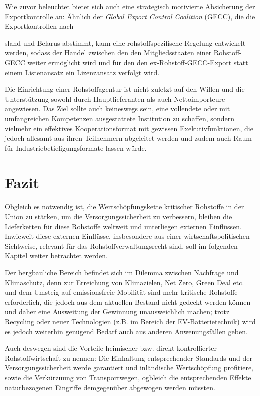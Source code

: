 \documentclass[12pt,a4paper,oneside]{book} %
\begin{document}
{Wie zuvor beleuchtet bietet sich auch eine strategisch motivierte Absicherung der Exportkontrolle an: Ähnlich der \textit{Global Export Control Coalition} (GECC), die die Exportkontrollen nach 

sland und Belarus abstimmt, kann eine rohstoffspezifische Regelung entwickelt werden, sodass der Handel zwischen den den Mitgliedsstaaten einer Rohstoff-GECC weiter ermöglicht wird und für den den ex-Rohstoff-GECC-Export statt einem Listenansatz ein Lizenzansatz verfolgt wird.\autocite[in Anlehnung an den Vorschlag von]{Medunic, Nr. 15, Juli 2024, S. 4}



Die Einrichtung einer Rohstoffagentur ist nicht zuletzt auf den Willen und die Unterstützung sowohl durch Hauptlieferanten als auch Nettoimporteure angewiesen. Das Ziel sollte auch keineswegs sein, eine vollendete oder mit umfangreichen Kompetenzen ausgestattete Institution zu schaffen, sondern vielmehr ein effektives Kooperationsformat mit gewissen Exekutivfunktionen, die jedoch allesamt aus ihren Teilnehmern abgeleitet werden und zudem auch Raum für Industriebetieligungsformate lassen würde.







\section{Fazit}
Obgleich es notwendig ist, die Wertschöpfungskette kritischer Rohstoffe in der Union zu stärken, um die Versorgungssicherheit zu verbessern, bleiben die Lieferketten für diese Rohstoffe weltweit und unterliegen externen Einflüssen. Inwieweit diese externen Einflüsse, insbesondere aus einer wirtschaftspolitischen Sichtweise, relevant für das Rohstoffverwaltungsrecht sind, soll im folgenden Kapitel weiter betrachtet werden.

Der bergbauliche Bereich befindet sich im Dilemma zwischen Nachfrage und Klimaschutz, denn zur Erreichung von Klimazielen, Net Zero, Green Deal etc. und dem Umsteig auf emissionsfreie Mobilität sind mehr kritische Rohstoffe erforderlich, die jedoch aus dem aktuellen Bestand nicht gedeckt werden können und daher eine Ausweitung der Gewinnung unausweichlich machen; trotz Recycling oder neuer Technologien (z.B. im Bereich der EV-Batterietechnik) wird es jedoch weiterhin genügend Bedarf auch aus anderen Anwenungsfällen geben.

Auch deswegen sind die Vorteile heimischer bzw. direkt kontrollierter Rohstoffwirtschaft zu nennen: Die Einhaltung entsprechender Standards und der Versorgungssicherheit werde garantiert und inländische Wertschöpfung profitiere, sowie die Verkürzuung von Transportwegen, ogbleich die entsprechenden Effekte naturbezogenen Eingriffe demgegenüber abgewogen werden müssten.\autocite{Frenz 2025, S. 311}

}
\end{document}
